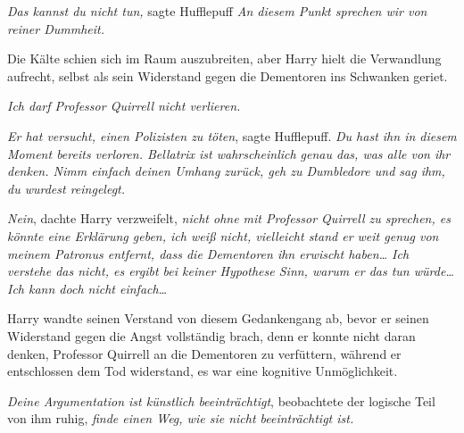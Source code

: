 \emph{Das kannst du nicht tun,} sagte Hufflepuff \emph{An diesem Punkt sprechen wir von reiner Dummheit.}

Die Kälte schien sich im Raum auszubreiten, aber Harry hielt die Verwandlung aufrecht, selbst als sein Widerstand gegen die Dementoren ins Schwanken geriet.

\emph{Ich darf Professor Quirrell nicht verlieren.}

\emph{Er hat versucht, einen Polizisten zu töten}, sagte Hufflepuff. \emph{Du hast ihn in diesem Moment bereits verloren. Bellatrix ist wahrscheinlich genau das, was alle von ihr denken. Nimm einfach deinen Umhang zurück, geh zu Dumbledore und sag ihm, du wurdest reingelegt.}

\emph{Nein}, dachte Harry verzweifelt, \emph{nicht ohne mit Professor Quirrell zu sprechen, es könnte eine Erklärung geben, ich weiß nicht, vielleicht stand er weit genug von meinem Patronus entfernt, dass die Dementoren ihn erwischt haben… Ich verstehe das nicht, es ergibt bei keiner Hypothese Sinn, warum er das tun würde… Ich kann doch nicht einfach…}

Harry wandte seinen Verstand von diesem Gedankengang ab, bevor er seinen Widerstand gegen die Angst vollständig brach, denn er konnte nicht daran denken, Professor Quirrell an die Dementoren zu verfüttern, während er entschlossen dem Tod widerstand, es war eine kognitive Unmöglichkeit.

\emph{Deine Argumentation ist künstlich beeinträchtigt}, beobachtete der logische Teil von ihm ruhig, \emph{finde einen Weg, wie sie nicht beeinträchtigt ist.}

